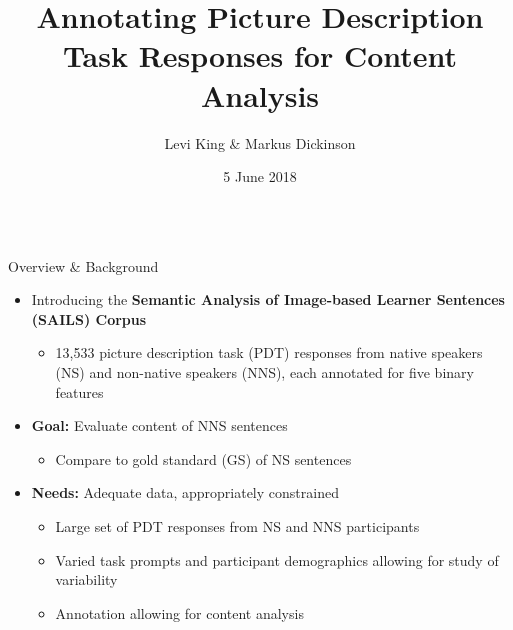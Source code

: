 \documentclass[final,t]{beamer}
\title[]{Annotating Picture Description Task Responses for Content Analysis}
\author[]{Levi King \& Markus Dickinson}
\institute[]{Indiana University}
\date[]{5 June 2018}
\begin{document}
\begin{frame}{}
  \begin{columns}[t]
    \begin{column}{.33\linewidth}

\begin{block}{Overview \& Background}
\begin{center}
\begin{minipage}{.85\textwidth}

  \begin{itemize}
    \itemsep1em
  \item{Introducing the \textbf{Semantic Analysis of Image-based Learner Sentences (SAILS) Corpus}
   \begin{itemize}
  \item 13,533 picture description task (PDT) responses from native speakers (NS) and non-native speakers (NNS), each annotated for five binary features
      \end{itemize}
    }
\end{itemize}
  \begin{itemize}
    \itemsep1em
  \item{\textbf{Goal:} Evaluate content of NNS sentences 
      \begin{itemize}
      \item Compare to gold standard (GS) of NS sentences
      \end{itemize}
    }
\end{itemize}
  
  \begin{itemize}
    \itemsep1em
  \item{\textbf{Needs:}  Adequate data, appropriately constrained
        \begin{itemize}
      \item Large set of PDT responses from NS and NNS participants
      \item Varied task prompts and participant demographics allowing for study of variability
      \item Annotation allowing for content analysis
      \end{itemize}
    }
\end{itemize}


\end{minipage}
\end{center}
\end{block}
\end{column}
\end{columns}
\end{frame}
\end{document}
